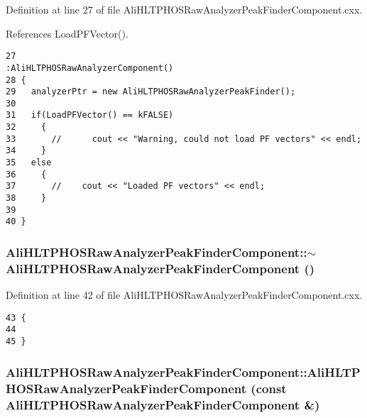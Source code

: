 Definition at line 27 of file Ali\-HLTPHOSRaw\-Analyzer\-Peak\-Finder\-Component.cxx.

References Load\-PFVector().

\footnotesize\begin{verbatim}27                                                                                   :AliHLTPHOSRawAnalyzerComponent()
28 {
29   analyzerPtr = new AliHLTPHOSRawAnalyzerPeakFinder();
30 
31   if(LoadPFVector() == kFALSE)
32     {
33       //      cout << "Warning, could not load PF vectors" << endl;
34     }
35   else 
36     {
37       //    cout << "Loaded PF vectors" << endl;
38     }
39 
40 } 
\end{verbatim}\normalsize 


\subsubsection{\setlength{\rightskip}{0pt plus 5cm}Ali\-HLTPHOSRaw\-Analyzer\-Peak\-Finder\-Component::$\sim${\bf Ali\-HLTPHOSRaw\-Analyzer\-Peak\-Finder\-Component} ()}\label{classAliHLTPHOSRawAnalyzerPeakFinderComponent_AliHLTPHOSRawAnalyzerPeakFinderComponenta1}




Definition at line 42 of file Ali\-HLTPHOSRaw\-Analyzer\-Peak\-Finder\-Component.cxx.

\footnotesize\begin{verbatim}43 {
44 
45 }
\end{verbatim}\normalsize 


\subsubsection{\setlength{\rightskip}{0pt plus 5cm}Ali\-HLTPHOSRaw\-Analyzer\-Peak\-Finder\-Component::Ali\-HLTPHOSRaw\-Analyzer\-Peak\-Finder\-Component (const {\bf Ali\-HLTPHOSRaw\-Analyzer\-Peak\-Finder\-Component} \&)\hspace{0.3cm}{\tt  [private]}}\label{classAliHLTPHOSRawAnalyzerPeakFinderComponent_AliHLTPHOSRawAnalyzerPeakFinderComponentd2}




